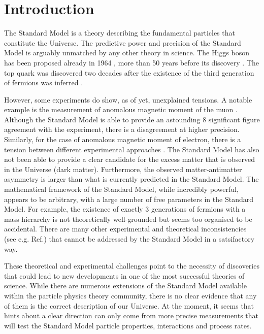 \chapter{Introduction}

The Standard Model is a theory describing the fundamental particles that constitute the Universe.
The predictive power and precision of the Standard Model is arguably unmatched by any other theory in science.
The Higgs boson has been proposed already in 1964 \cite{PhysRevLett.13.508}, more than 50 years before its discovery \cite{ATLAS:2012yve,CMS:2012qbp}.
The top quark was discovered \cite{PhysRevLett.74.2632,PhysRevLett.74.2626} two decades after the existence of the third generation of fermions was inferred \cite{HARARI1975265}.

However, some experiments do show, as of yet, unexplained tensions. 
A notable example is the measurement of anomalous magnetic moment of the muon \cite{PhysRevLett.126.141801}.
Although the Standard Model is able to provide an astounding 8 significant figure agreement with the experiment, there is a disagreement at higher precision.
Similarly, for the case of anomalous magnetic moment of electron, there is a tension between different experimental approaches \cite{PhysRevLett.100.120801,Morel:2020dww,Li:2021koa}.
The Standard Model has also not been able to provide a clear candidate for the excess matter that is observed in the Universe (dark matter).
Furthermore, the observed matter-antimatter asymmetry is larger than what is currently predicted in the Standard Model.
The mathematical framework of the Standard Model, while incredibly powerful, appears to be arbitrary, with a large number of free parameters in the Standard Model.
For example, the existence of exactly 3 generations of fermions with a mass hierarchy is not theoretically well-grounded but seems too organised to be accidental.
There are many other experimental and theoretical inconsistencies (see e.g. Ref.\cite{Ellis:2002wba}) that cannot be addressed by the Standard Model in a satsifactory way.

These theoretical and experimental challenges point to the necessity of discoveries that could lead to new developments in one of the most successful theories of science.
While there are numerous extensions of the Standard Model available within the particle physics theory community, there is no clear evidence that any of them is the correct description of our Universe.
At the moment, it seems that hints about a clear direction can only come from more precise measurements that will test the Standard Model particle properties, interactions and process rates.


